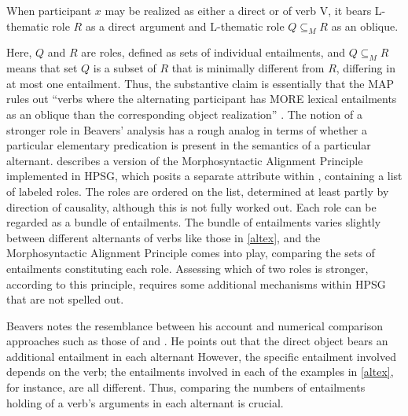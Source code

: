 \documentclass[output=paper
                ,modfonts
                ,nonflat
	        ,collection
	        ,collectionchapter
	        ,collectiontoclongg
 	        ,biblatex
                ,babelshorthands
                ,newtxmath
                ,draftmode
                ,colorlinks, citecolor=brown
]{./langsci/langscibook}
\begin{document}
\begin{exe}
\ex\label{beavers-map}
When participant $x$ may be realized as either a direct or  of verb V, it bears L-thematic role $R$ as a direct argument and L-thematic role $Q\subseteq_{M}R$ as an oblique.
\citep[848]{Beavers2010}
\end {exe}

\noindent
Here, $Q$ and $R$ are roles, defined as sets of individual entailments, and  $Q\subseteq_{M}R$ means that set $Q$ is a subset of $R$ that is minimally different from $R$, differing in at most one entailment.
Thus, the substantive claim is essentially that the MAP rules out ``verbs where the alternating participant has \textsc{MORE} lexical entailments as an oblique than the corresponding object realization'' \citep[849]{Beavers2010}.
The notion of a stronger role in Beavers' analysis has a rough analog in terms of whether a particular elementary predication is present in the semantics of a particular alternant.
\citet{Beavers2005} describes a version of the Morphosyntactic Alignment Principle implemented in HPSG, which posits a separate  attribute within , containing a list of labeled roles.
The roles are ordered on the  list, determined at least partly by direction of causality, although this is not fully worked out.
Each role can be regarded as a bundle of entailments.
The bundle of entailments varies slightly between different alternants of verbs like those in \ref{altex}, and the Morphosyntactic Alignment Principle comes into play, comparing the sets of entailments constituting each role.
Assessing which of two roles is stronger, according to this principle, requires some additional mechanisms within HPSG that are not spelled out.

Beavers notes the resemblance between his account and numerical comparison approaches such as those of \citet{Dowty1991} and \citet{AckermanandMoore2001}.
He points out that the direct object bears an additional entailment in each alternant  However, the specific entailment involved depends on the verb; the entailments involved in each of the examples in \ref{altex}, for instance, are all different.  Thus, comparing the numbers of entailments holding of a verb's arguments in each alternant is crucial.
\end{document}
